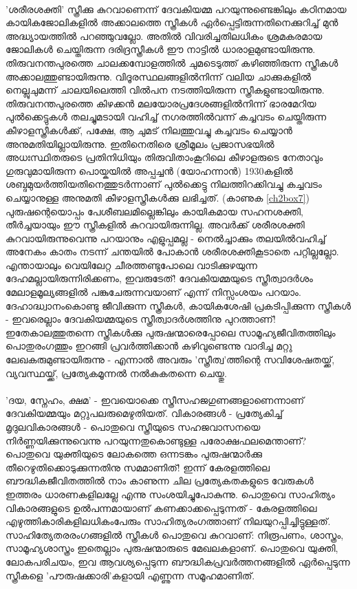 \paragraph{}
 'ശരീരശക്തി' സ്ത്രീക്കു കുറവാണെന്ന് ദേവകിയമ്മ പറയുന്നുണ്ടെങ്കിലും കഠിനമായ കായികജോലികളിൽ അക്കാലത്തെ സ്ത്രീകൾ ഏർപ്പെട്ടിരുന്നതിനെക്കുറിച്ച് മുൻ അദ്ധ്യായത്തിൽ പറഞ്ഞുവല്ലോ. അതിൽ വിവരിച്ചതിലധികം ശ്രമകരമായ ജോലികൾ ചെയ്തിരുന്ന ദരിദ്രസ്ത്രീകൾ ഈ നാട്ടിൽ ധാരാളമുണ്ടായിരുന്നു. തിരുവനന്തപുരത്തെ ചാലക്കമ്പോളത്തിൽ ചുമടെടുത്ത് കഴിഞ്ഞിരുന്ന സ്ത്രീകൾ അക്കാലത്തുണ്ടായിരുന്നു. വിദൂരസ്ഥലങ്ങളിൽനിന്ന് വലിയ ചാക്കുകളിൽ നെല്ലുചുമന്ന് ചാലയിലെത്തി വിൽപന നടത്തിയിരുന്ന സ്ത്രീകളുണ്ടായിരുന്നു. തിരുവനന്തപുരത്തെ കിഴക്കൻ മലയോരപ്രദേശങ്ങളിൽനിന്ന് ഭാരമേറിയ പുൽക്കെട്ടുകൾ തലച്ചുമടായി വഹിച്ച് നഗരത്തിൽവന്ന് കച്ചവടം ചെയ്തിരുന്ന കീഴാളസ്ത്രീകൾക്ക്, പക്ഷേ, ആ ചുമട് നിലത്തുവച്ചു കച്ചവടം ചെയ്യാൻ അനുമതിയില്ലായിരുന്നു. ഇതിനെതിരെ ശ്രീമൂലം പ്രജാസഭയിൽ അധഃസ്ഥിതരുടെ പ്രതിനിധിയും തിരുവിതാംകൂറിലെ കീഴാളരുടെ നേതാവും ഗുരുവുമായിരുന്ന പൊയ്കയിൽ അപ്പച്ചൻ (യോഹന്നാൻ) 1930കളിൽ ശബ്ദമുയർത്തിയതിനെത്തുടർന്നാണ് പുൽക്കെട്ടു നിലത്തിറക്കിവച്ചു കച്ചവടം ചെയ്യാനുള്ള അനുമതി കീഴാളസ്ത്രീകൾക്കു ലഭിച്ചത്. (കാണുക \ref{ch2box7})	പുരുഷന്റെയൊപ്പം പേശീബലമില്ലെങ്കിലും കായികമായ സഹനശക്തി, തീർച്ചയായും ഈ സ്ത്രീകളിൽ കുറവായിരുന്നില്ല. അവർക്ക് ശരീരശക്തി കുറവായിരുന്നുവെന്നു പറയാനും എളുപ്പമല്ല - നെൽച്ചാക്കും തലയിൽവഹിച്ച് അനേകം കാതം നടന്ന് ചന്തയിൽ പോകാൻ ശരീരശക്തികൂടാതെ പറ്റില്ലല്ലോ. എന്തായാലും വെയിലേറ്റ ചീരത്തണ്ടുപോലെ വാടിക്കുഴയുന്ന ദേഹമല്ലായിരുന്നിരിക്കണം, ഇവരുടേത്! ദേവകിയമ്മയുടെ സ്ത്രീത്വാദർശം മേലാളമൂല്യങ്ങളിൽ പങ്കുചേരുന്നവയാണ് എന്ന് നിസ്സംശയം പറയാം. ദേഹാദ്ധ്വാനംകൊണ്ടു ജീവിക്കുന്ന സ്ത്രീകൾ, കായികശേഷി പ്രകടിപ്പിക്കുന്ന സ്ത്രീകൾ - ഇവരെല്ലാം ദേവകിയമ്മയുടെ സ്ത്രീത്വാദർശത്തിനു പുറത്താണ്! ഇതേകാലത്തുതന്നെ സ്ത്രീകൾക്കു പുരുഷന്മാരെപ്പോലെ സാമൂഹ്യജീവിതത്തിലും പൊതുരംഗത്തും ഇറങ്ങി പ്രവർത്തിക്കാൻ കഴിവുണ്ടെന്നു വാദിച്ച മറ്റു ലേഖകരുമുണ്ടായിരുന്നു - എന്നാൽ അവരും 'സ്ത്രീത്വ'ത്തിന്റെ സവിശേഷതയ്ക്ക്, വ്യവസ്ഥയ്ക്ക്, പ്രത്യേകമൂന്നൽ നൽകുകതന്നെ ചെയ്തു.

\paragraph{}'ദയ, സ്നേഹം, ക്ഷമ' - ഇവയൊക്കെ സ്ത്രീസഹജഗുണങ്ങളാണെന്നാണ് ദേവകിയമ്മയും മറ്റുപലരുമെഴുതിയത്. വികാരങ്ങൾ - പ്രത്യേകിച്ച് മൃദുലവികാരങ്ങൾ - പൊതുവെ സ്ത്രീയുടെ സഹജവാസനയെ നിർണ്ണയിക്കുന്നുവെന്നു പറയുന്നതുകൊണ്ടുള്ള പരോക്ഷഫലമെന്താണ്? പൊതുവെ യുക്തിയുടെ ലോകത്തെ ഒന്നടങ്കം പുരുഷന്മാർക്കു തീറെഴുതിക്കൊടുക്കുന്നതിനു സമമാണിത്! ഇന്ന് കേരളത്തിലെ ബൗദ്ധികജീവിതത്തിൽ നാം കാണുന്ന ചില പ്രത്യേകതകളുടെ വേരുകൾ ഇത്തരം ധാരണകളിലല്ലേ എന്നു സംശയിച്ചുപോകുന്നു. പൊതുവെ സാഹിത്യം വികാരങ്ങളുടെ ഉൽപന്നമായാണ് കണക്കാക്കപ്പെടുന്നത് - കേരളത്തിലെ എഴുത്തികാരികളിലധികംപേരും സാഹിത്യരംഗത്താണ് നിലയുറപ്പിച്ചിട്ടുള്ളത്. സാഹിത്യേതരരംഗങ്ങളിൽ സ്ത്രീകൾ പൊതുവെ കുറവാണ്: നിരൂപണം, ശാസ്ത്രം, സാമൂഹ്യശാസ്ത്രം ഇതെല്ലാം പുരുഷന്മാരുടെ മേഖലകളാണ്. പൊതുവെ യുക്തി, ലോകപരിചയം, ഇവ ആവശ്യപ്പെടുന്ന ബൗദ്ധികപ്രവർത്തനങ്ങളിൽ ഏർപ്പെടുന്ന സ്ത്രീകളെ 'പൗരുഷക്കാരി'കളായി എണ്ണുന്ന സമൂഹമാണിത്.


